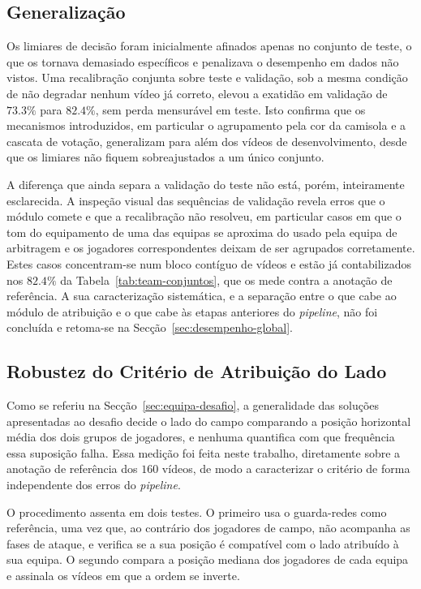 \subsection{Generalização}

Os limiares de decisão foram inicialmente afinados apenas no conjunto de teste, o que os tornava demasiado específicos e penalizava o desempenho em dados não vistos. Uma recalibração conjunta sobre teste e validação, sob a mesma condição de não degradar nenhum vídeo já correto, elevou a exatidão em validação de $73.3\%$ para $82.4\%$, sem perda mensurável em teste. Isto confirma que os mecanismos introduzidos, em particular o agrupamento pela cor da camisola e a cascata de votação, generalizam para além dos vídeos de desenvolvimento, desde que os limiares não fiquem sobreajustados a um único conjunto.

A diferença que ainda separa a validação do teste não está, porém, inteiramente esclarecida. A inspeção visual das sequências de validação revela erros que o módulo comete e que a recalibração não resolveu, em particular casos em que o tom do equipamento de uma das equipas se aproxima do usado pela equipa de arbitragem e os jogadores correspondentes deixam de ser agrupados corretamente. Estes casos concentram-se num bloco contíguo de vídeos e estão já contabilizados nos $82.4\%$ da Tabela~\ref{tab:team-conjuntos}, que os mede contra a anotação de referência. A sua caracterização sistemática, e a separação entre o que cabe ao módulo de atribuição e o que cabe às etapas anteriores do \emph{pipeline}, não foi concluída e retoma-se na Secção~\ref{sec:desempenho-global}.

\subsection{Robustez do Critério de Atribuição do Lado}

Como se referiu na Secção~\ref{sec:equipa-desafio}, a generalidade das soluções apresentadas ao desafio decide o lado do campo comparando a posição horizontal média dos dois grupos de jogadores, e nenhuma quantifica com que frequência essa suposição falha. Essa medição foi feita neste trabalho, diretamente sobre a anotação de referência dos $160$ vídeos, de modo a caracterizar o critério de forma independente dos erros do \emph{pipeline}.

O procedimento assenta em dois testes. O primeiro usa o guarda-redes como referência, uma vez que, ao contrário dos jogadores de campo, não acompanha as fases de ataque, e verifica se a sua posição é compatível com o lado atribuído à sua equipa. O segundo compara a posição mediana dos jogadores de cada equipa e assinala os vídeos em que a ordem se inverte.

